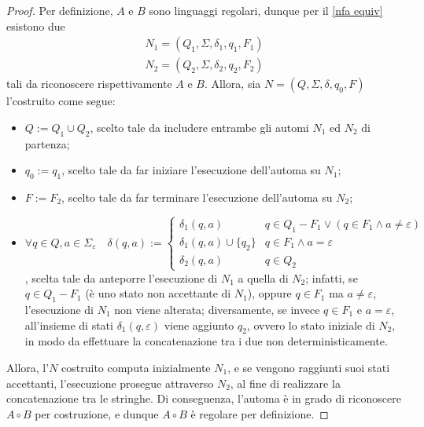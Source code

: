 \documentclass[a4paper, 12pt]{report}
\begin{document}
    \begin{proof}
        Per definizione, $A$ e $B$ sono linguaggi regolari, dunque per il \cref{nfa equiv} esistono due \NFA $$\left. \begin{array}{c}N_1 = (Q_1, \Sigma, \delta_1, q_1, F_1) \\ N_2 = (Q_2, \Sigma, \delta_2, q_2, F_2) \end{array} \right.$$ tali da riconoscere rispettivamente $A$ e $B$. Allora, sia $N = (Q, \Sigma, \delta, q_0, F)$ l'\NFA costruito come segue:
        
        \begin{itemize}
            \item $Q := Q_1 \cup Q_2$, scelto tale da includere entrambe gli automi $N_1$ ed $N_2$ di partenza;
            \item $q_0 := q_1$, scelto tale da far iniziare l'esecuzione dell'automa su $N_1$;
            \item $F := F_2$, scelto tale da far terminare l'esecuzione dell'automa su $N_2$;
            \item $\forall q \in Q, a \in \Sigma_\varepsilon \quad \delta(q, a) := \left \{ \begin{array}{ll} \delta_1(q, a) & q \in Q_1 - F_1 \lor (q \in F_1 \land a \neq \varepsilon) \\ \delta_1(q, a) \cup \{q_2\} & q \in F_1 \land a = \varepsilon \\ \delta_2(q, a) & q \in Q_2 \end{array} \right.$, scelta tale da anteporre l'esecuzione di $N_1$ a quella di $N_2$; infatti, se $q \in Q_1 - F_1$ (è uno stato non accettante di $N_1$), oppure $q \in F_1$ ma $a \neq \varepsilon$, l'esecuzione di $N_1$ non viene alterata; diversamente, se invece $q \in F_1$ e $a = \varepsilon$, all'insieme di stati $\delta_1(q, \varepsilon)$ viene aggiunto $q_2$, ovvero lo stato iniziale di $N_2$, in modo da effettuare la concatenazione tra i due \NFA non deterministicamente.
        \end{itemize}


        Allora, l'\NFA $N$ costruito computa inizialmente $N_1$, e se vengono raggiunti suoi stati accettanti, l'esecuzione prosegue attraverso $N_2$, al fine di realizzare la concatenazione tra le stringhe. Di conseguenza, l'automa è in grado di riconoscere $A \circ B$ per costruzione, e dunque $A \circ B$ è regolare per definizione.
    \end{proof}
\end{document}
